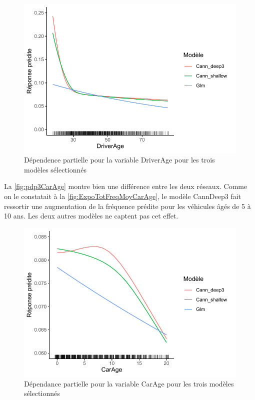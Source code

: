 \begin{figure}
\centering
\caption{\label{fig:pdp3DriverAge} Dépendence partielle pour la variable DriverAge pour les trois modèles sélectionnés }
\includegraphics[scale=0.9]{Graphiques/pdp3modDriverAge}
\end{figure}




La \autoref{fig:pdp3CarAge} montre bien une différence entre les deux réseaux. Comme on le constatait à la \autoref{fig:ExpoTotFreqMoyCarAge}, le modèle CannDeep3 fait ressortir une augmentation de la fréquence prédite pour les véhicules âgés de 5 à 10 ans. Les deux autres modèles ne captent pas cet effet.


\begin{figure}
\centering
\caption{\label{fig:pdp3CarAge} Dépendance partielle pour la variable CarAge pour les trois modèles sélectionnés }
\includegraphics[scale=0.9]{Graphiques/pdpMod3CarAge}
\end{figure}

